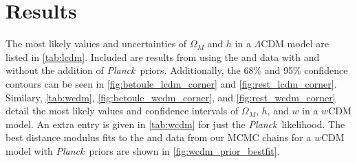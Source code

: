\documentclass[12pt,a4paper]{article}
\newcommand\Planck{{\it Planck}\ }
\begin{document}
\section{Results}
\label{sec:results}
The most likely values and uncertainties of $\Omega_M$ and $h$ 
in a $\Lambda$CDM model are listed in \autoref{tab:lcdm}. Included are results from
using the \citet{betoule2014} and \citet{rest2014} data with and without the addition 
of \Planck priors. Additionally, the 68\% and 95\% confidence contours can be seen
in \autoref{fig:betoule_lcdm_corner} and \autoref{fig:rest_lcdm_corner}. Similary, \autoref{tab:wcdm}, 
\autoref{fig:betoule_wcdm_corner}, and \autoref{fig:rest_wcdm_corner}
detail the most likely values and confidence intervals of $\Omega_M$, $h$, and $w$ 
in a $w$CDM model. An extra entry is given in \autoref{tab:wcdm} for just the 
\Planck likelihood. The best distance modulus fits to the \citet{betoule2014} and \citet{rest2014} data
from our MCMC chains for a $w$CDM model with \Planck priors are shown in \autoref{fig:wcdm_prior_bestfit}. 
\end{document}
